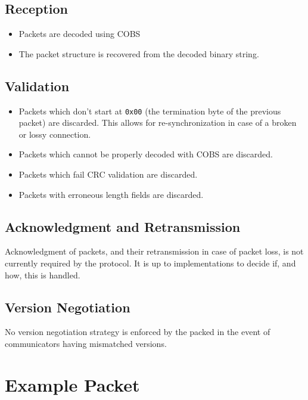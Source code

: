 \documentclass[a4paper,11pt,english]{article}
\begin{document}
\subsection[op:rx]{Reception}
\begin{itemize}
  \item Packets are decoded using COBS
  \item The packet structure is recovered from the decoded binary string.
\end{itemize}

\subsection[op:vx]{Validation}
\begin{itemize}
  \item Packets which don't start at \texttt{0x00} (the termination byte of the previous packet) are discarded. This allows for re-synchronization in case of a broken or lossy connection.
  \item Packets which cannot be properly decoded with COBS are discarded.
  \item Packets which fail CRC validation are discarded.
  \item Packets with erroneous length fields are discarded.
\end{itemize}

\subsection[op:ack-retx]{Acknowledgment and Retransmission}
Acknowledgment of packets, and their retransmission in case of packet loss, is not currently required by the protocol. It is up to implementations to decide if, and how, this is handled.

\subsection[op:version]{Version Negotiation}
No version negotiation strategy is enforced by the packed in the event of communicators having mismatched versions.


\section[ex-packet]{Example Packet}
\end{document}
